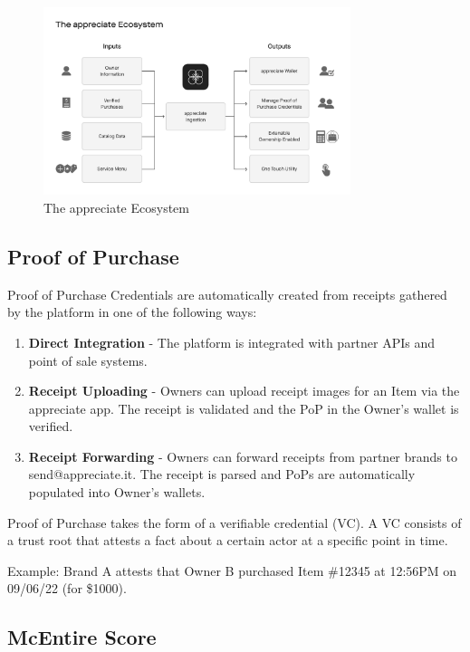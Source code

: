 \documentclass[a4paper,onecolumn, 10.5pt]{article}
\begin{document}
\begin{figure}[!htb]
	\centering %
		\includegraphics[clip, trim=0cm 2cm 0cm 6cm, width=0.80\textwidth]{./images/Ecosystem.pdf}
	\caption{The appreciate Ecosystem }
	\label{fig: ecosystem}
\end{figure}



\subsection{Proof of Purchase}

Proof of Purchase Credentials are automatically created from receipts gathered by the platform in one of the following ways:
\begin{enumerate}
	\item \textbf{Direct Integration} - The platform is integrated with partner APIs and point of sale systems. 
	\item \textbf{Receipt Uploading} - Owners can upload receipt images for an Item via the appreciate app. The receipt is validated and the PoP in the Owner’s wallet is verified.
	\item \textbf{Receipt Forwarding} - Owners can forward receipts from partner brands to send@appreciate.it. The receipt is parsed and PoPs are automatically populated into Owner’s wallets.
\end{enumerate}

Proof of Purchase takes the form of a verifiable credential (VC)\cite{verifiablecred}. A VC consists of a trust root that attests a fact about a certain actor at a specific point in time. 

\hspace{1cm} {\scriptsize Example: Brand A attests that Owner B purchased Item \#12345 at 12:56PM on 09/06/22 (for \$1000). }


\subsection {McEntire Score}
\end{document}
